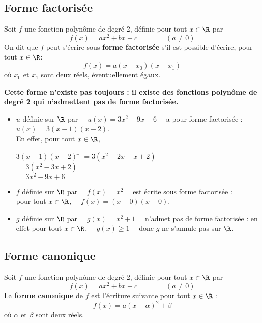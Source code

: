 \documentclass[a4paper,11pt,cours]{nsi}
\begin{document}
\subsection{Forme factorisée}
\begin{definition}
	Soit $f$ une fonction polynôme de degré 2, définie pour tout $x\in\R$ par
	$$f(x)=ax^2+bx+c\qquad\qquad(a\neq 0)$$
	On dit que $f$ peut s'écrire sous \textbf{forme factorisée} s'il est possible d'écrire, pour tout $x\in\R$:
	\textbf{\boldmath $$f(x)=a(x-x_0)(x-x_1)$$}
	où $x_0$ et $x_1$ sont deux réels, éventuellement égaux.\\
\end{definition}

\begin{propriete}
	\textbf{Cette forme n'existe pas toujours : il existe des fonctions polynôme de degré 2 qui n'admettent pas de forme factorisée.}
\end{propriete}

\begin{demonstration}
\end{demonstration}

\begin{exemple}[s]
	\begin{itemize}
		\item 	$u$ définie sur $\R$ par $\quad u(x)=3x^2-9x+6\quad $ a pour forme factorisée :\\$u(x)=3(x-1)(x-2)$.\\
		En effet, pour tout $x\in\R$,
		\begin{tabbing}
			$3(x-1)(x-2)$	\=	$=3(x^2-2x-x+2)$\\
			\>	$=3(x^2-3x+2)$\\
			\>	$=3x^2-9x+6$
		\end{tabbing}
		\item 	$f$ définie sur $\R$ par $\quad f(x)=x^2 \quad$ est écrite sous forme factorisée :\\ pour tout $x\in\R$, $\quad f(x)=(x-0)(x-0)$.
		\item 	$g$ définie sur $\R$ par $\quad g(x)=x^2+1\quad$ n'admet pas de forme factorisée : en effet pour tout $x\in\R$, $\quad g(x)\geqslant1 \quad$ donc $g$
		ne s'annule pas sur $\R$.
	\end{itemize}
\end{exemple}

\subsection{Forme canonique}
\begin{definition}
	Soit $f$ une fonction polynôme de degré 2, définie pour tout $x\in\R$ par
	$$f(x)=ax^2+bx+c\qquad\qquad(a\neq 0)$$
	La \textbf{forme canonique} de $f$ est l'écriture suivante pour tout $x\in\R$ :
	{\boldmath $$f(x)=a(x-\alpha)^2+\beta$$}
	où $\alpha$ et $\beta$ sont deux réels.\\
\end{definition}
\end{document}

